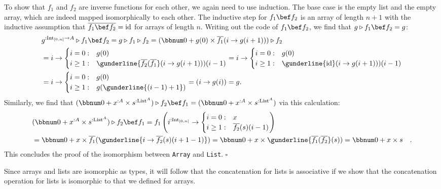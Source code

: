 To show that $f_{1}$ and $f_{2}$ are inverse functions for each
other, we again need to use induction. The base case is the empty
list and the empty array, which are indeed mapped isomorphically to
each other. The inductive step for $f_{1}\bef f_{2}$ is an array
of length $n+1$ with the inductive assumption that $\overline{f_{1}\bef f_{2}}=\text{id}$
for arrays of length $n$. Writing out the code of $f_{1}\bef f_{2}$,
we find that $g\triangleright f_{1}\bef f_{2}=g$:
\begin{align*}
 & g^{:\text{Int}_{[0,n]}\rightarrow A}\triangleright f_{1}\bef f_{2}=g\triangleright f_{1}\triangleright f_{2}=(\bbnum 0+g(0)\times\overline{f_{1}}(i\rightarrow g(i+1)))\triangleright f_{2}\\
 & =i\rightarrow\begin{cases}
i=0: & g(0)\\
i\geq1: & \gunderline{\overline{f_{2}}(\overline{f_{1}}}(i\rightarrow g(i+1)))(i-1)
\end{cases}=i\rightarrow\begin{cases}
i=0: & g(0)\\
i\geq1: & \gunderline{\text{id}}(i\rightarrow g(i+1)))(i-1)
\end{cases}\\
 & =i\rightarrow\begin{cases}
i=0: & g(0)\\
i\geq1: & g(\gunderline{\left(i-1\right)+1})
\end{cases}=\left(i\rightarrow g(i)\right)=g.
\end{align*}
Similarly, we find that $(\bbnum 0+x^{:A}\times s^{:\text{List}^{A}})\triangleright f_{2}\bef f_{1}=(\bbnum 0+x^{:A}\times s^{:\text{List}^{A}})$
via this calculation:
\begin{align*}
 & (\bbnum 0+x^{:A}\times s^{:\text{List}^{A}})\triangleright f_{2}\bef f_{1}=f_{1}\left(i^{:\text{Int}_{[0,n]}}\rightarrow\begin{cases}
i=0: & x\\
i\geq1: & \overline{f_{2}}(s)(i-1)
\end{cases}\right)\\
 & =\bbnum 0+x\times\overline{f_{1}}(\gunderline{i\rightarrow\overline{f_{2}}(s)(i+1-1)})=\bbnum 0+x\times\gunderline{\overline{f_{1}}(\overline{f_{2}}}(s))=\bbnum 0+x\times s\quad.
\end{align*}
This concludes the proof of the isomorphism between \lstinline!Array!
and \lstinline!List!. $\square$

Since arrays and lists are isomorphic as types, it will follow that
the concatenation for lists is associative if we show that the concatenation
operation for lists is isomorphic to that we defined for arrays.

